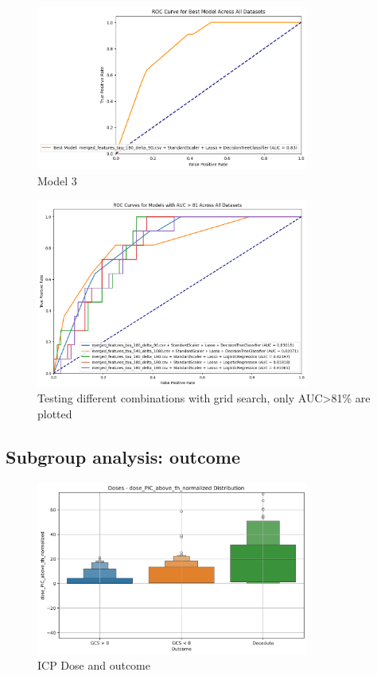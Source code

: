 \begin{figure}[h]
    \centering
    \includegraphics[width=0.8\textwidth]{pictures/fig7_model3.png}
    \caption{Model 3} %
    \label{fig:model3} %
\end{figure}
\begin{figure}
	\centering
	\includegraphics[width=0.8\textwidth]{pictures/fig8_model3tau.png}
	\caption{Testing different combinations with grid search, only AUC>81\% are plotted} %
    \label{fig:model3tau} %
\end{figure}


\subsection{Subgroup analysis: outcome}

\begin{figure}[h!]
    \centering
    \includegraphics[width=0.8\textwidth]{pictures/fig9_ICPdose.png}
    \caption{ICP Dose and outcome} %
    \label{fig:ICPdose_outcome} %
\end{figure}

